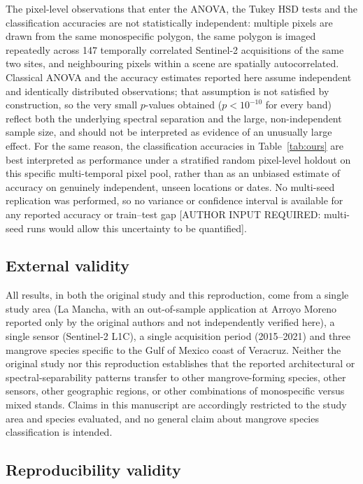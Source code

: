 \documentclass[10pt,twocolumn,a4paper]{article}
\begin{document}
The pixel-level observations that enter the ANOVA, the Tukey HSD tests and the classification
accuracies are not statistically independent: multiple pixels are drawn from the same monospecific
polygon, the same polygon is imaged repeatedly across 147 temporally correlated Sentinel-2
acquisitions of the same two sites, and neighbouring pixels within a scene are spatially
autocorrelated. Classical ANOVA and the accuracy estimates reported here assume independent and
identically distributed observations; that assumption is not satisfied by construction, so the very
small $p$-values obtained ($p<10^{-10}$ for every band) reflect both the underlying spectral
separation and the large, non-independent sample size, and should not be interpreted as evidence of
an unusually large effect. For the same reason, the classification accuracies in
Table~\ref{tab:ours} are best interpreted as performance under a stratified random pixel-level
holdout on this specific multi-temporal pixel pool, rather than as an unbiased estimate of accuracy
on genuinely independent, unseen locations or dates. No multi-seed replication was performed, so no
variance or confidence interval is available for any reported accuracy or train--test gap
[AUTHOR INPUT REQUIRED: multi-seed runs would allow this uncertainty to be quantified].

\subsection{External validity}
\label{sec:threats-external}

All results, in both the original study and this reproduction, come from a single study area
(La Mancha, with an out-of-sample application at Arroyo Moreno reported only by the original
authors and not independently verified here), a single sensor (Sentinel-2 L1C), a single
acquisition period (2015--2021) and three mangrove species specific to the Gulf of Mexico coast of
Veracruz. Neither the original study nor this reproduction establishes that the reported
architectural or spectral-separability patterns transfer to other mangrove-forming species,
other sensors, other geographic regions, or other combinations of monospecific versus mixed stands.
Claims in this manuscript are accordingly restricted to the study area and species evaluated, and no
general claim about mangrove species classification is intended.

\subsection{Reproducibility validity}
\label{sec:threats-repro}
\end{document}
